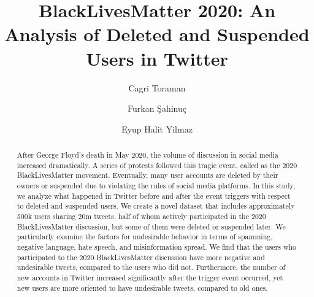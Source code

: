 \documentclass[sigconf]{acmart}
\begin{document}
\title{BlackLivesMatter 2020: An Analysis of Deleted and Suspended Users in Twitter}

\author{Cagri Toraman}
\orcid{}

\author{Furkan \c{S}ahinu\c{c}}

\author{Eyup Halit Yilmaz}

\renewcommand{\shortauthors}{Toraman et al.}

\begin{abstract}
After George Floyd's death in May 2020, the volume of discussion in social media increased dramatically. A series of protests followed this tragic event, called as the 2020 BlackLivesMatter movement. Eventually, many user accounts are deleted by their owners or suspended due to violating the rules of social media platforms. In this study, we analyze what happened in Twitter before and after the event triggers with respect to deleted and suspended users. We create a novel dataset that includes approximately 500k users sharing 20m tweets, half of whom actively participated in the 2020 BlackLivesMatter discussion, but some of them were deleted or suspended later. We particularly examine the factors for undesirable behavior in terms of spamming, negative language, hate speech, and misinformation spread. We find that the users who participated to the 2020 BlackLivesMatter discussion have more negative and undesirable tweets, compared to the users who did not. Furthermore, the number of new accounts in Twitter increased significantly after the trigger event occurred, yet new users are more oriented to have undesirable tweets, compared to old ones.
\end{abstract}
\end{document}
